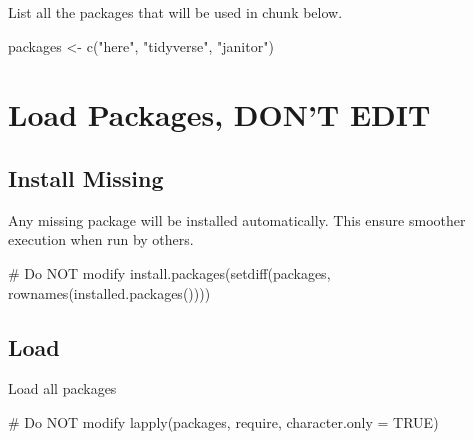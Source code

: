 \documentclass[
  letterpaper,
  DIV=11,
  numbers=noendperiod]{scrreprt}
\newenvironment{Shaded}{\begin{snugshade}}{\end{snugshade}}
\newcommand{\AttributeTok}[1]{\textcolor[rgb]{0.40,0.45,0.13}{#1}}
\newcommand{\CommentTok}[1]{\textcolor[rgb]{0.37,0.37,0.37}{#1}}
\newcommand{\ConstantTok}[1]{\textcolor[rgb]{0.56,0.35,0.01}{#1}}
\newcommand{\FunctionTok}[1]{\textcolor[rgb]{0.28,0.35,0.67}{#1}}
\newcommand{\NormalTok}[1]{\textcolor[rgb]{0.00,0.23,0.31}{#1}}
\newcommand{\OtherTok}[1]{\textcolor[rgb]{0.00,0.23,0.31}{#1}}
\newcommand{\StringTok}[1]{\textcolor[rgb]{0.13,0.47,0.30}{#1}}
\begin{document}
List all the packages that will be used in chunk below.

\begin{Shaded}
\begin{Highlighting}[]
\NormalTok{packages }\OtherTok{\textless{}{-}} \FunctionTok{c}\NormalTok{(}\StringTok{"here"}\NormalTok{, }\StringTok{"tidyverse"}\NormalTok{, }\StringTok{"janitor"}\NormalTok{)}
\end{Highlighting}
\end{Shaded}

\section*{Load Packages, DON'T EDIT}\label{sec-packages}


\subsection*{Install Missing}\label{install-missing}

Any missing package will be installed automatically. This ensure
smoother execution when run by others.

\begin{Shaded}
\begin{Highlighting}[]
\CommentTok{\# Do NOT modify}
\FunctionTok{install.packages}\NormalTok{(}\FunctionTok{setdiff}\NormalTok{(packages, }\FunctionTok{rownames}\NormalTok{(}\FunctionTok{installed.packages}\NormalTok{())))}
\end{Highlighting}
\end{Shaded}

\subsection*{Load}\label{load}

Load all packages

\begin{Shaded}
\begin{Highlighting}[]
\CommentTok{\# Do NOT modify}
\FunctionTok{lapply}\NormalTok{(packages, require, }\AttributeTok{character.only =} \ConstantTok{TRUE}\NormalTok{)}
\end{Highlighting}
\end{Shaded}
\end{document}
